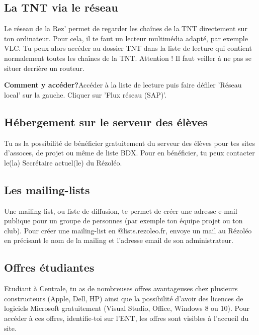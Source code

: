 \documentclass[12pt]{article}
\begin{document}
{  \subsection{La TNT via le réseau}
    Le réseau de la Rez’ permet de regarder les chaînes de la TNT directement sur ton ordinateur. Pour cela, il te faut un lecteur multimédia adapté, par exemple VLC.
    Tu peux alors accéder au dossier TNT dans la liste de lecture qui contient normalement toutes les chaînes de la TNT.
    \newline Attention ! Il faut veiller à ne pas se situer derrière un routeur.
    \begin{description}
      \item \textbf{Comment y accéder?}\newline Accéder à la liste de lecture puis faire défiler 'Réseau local' sur la gauche. Cliquer sur 'Flux réseau (SAP)'.
    \end{description}
  \subsection{Hébergement sur le serveur des élèves}
    Tu as la possibilité de bénéficier gratuitement du serveur des élèves pour tes sites d’assoces, de projet ou même de liste BDX. Pour en bénéficier, tu peux contacter le(la) Secrétaire actuel(le) du Rézoléo.
  \subsection{Les mailing-lists}
    Une mailing-list, ou liste de diffusion, te permet de créer une adresse e-mail publique pour un groupe de personnes (par exemple ton équipe projet ou ton club).
    Pour créer une mailing-list en @lists.rezoleo.fr, envoye un mail au Rézoléo en précisant le nom de la mailing et l’adresse email de son administrateur.
  \subsection{Offres étudiantes}
    Etudiant à Centrale, tu as de nombreuses offres avantageuses chez plusieurs constructeurs (Apple, Dell, HP) ainsi que la possibilité d’avoir des licences de logiciels Microsoft gratuitement (Visual Studio, Office, Windows 8 ou 10).
    Pour accéder à ces offres, identifie-toi sur l’ENT, les offres sont visibles à l'accueil du site.
}
\end{document}
